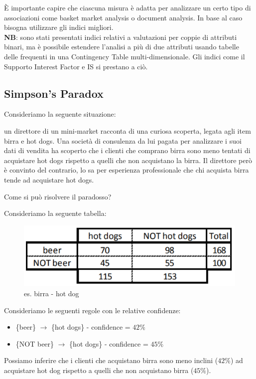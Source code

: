 È importante capire che ciascuna misura è adatta per analizzare un certo tipo di associazioni come basket market analysis o document analysis. In base al caso bisogna utilizzare gli indici migliori.\\

\textbf{NB}: sono stati presentati indici relativi a valutazioni per coppie di attributi binari, ma è possibile estendere l'analisi a più di due attributi usando tabelle delle frequenti in una Contingency Table multi-dimensionale. Gli indici come il Supporto Interest Factor e IS si prestano a ciò.

\subsection{Simpson's Paradox}

Consideriamo la seguente situazione:

un direttore di un mini-market racconta di una curiosa scoperta, legata agli item birra e hot dogs. Una società di consulenza da lui pagata per analizzare i suoi dati di vendita ha scoperto che i clienti che comprano birra sono meno tentati di acquistare hot dogs rispetto a quelli che non acquistano la birra. Il direttore però è convinto del contrario, lo sa per esperienza professionale che chi acquista birra tende ad acquistare hot dogs.

Come si può risolvere il paradosso?

Consideriamo la seguente tabella:
\begin{figure}[H]
	\centering
	\includegraphics[height=0.2 \linewidth]{association/pict/beer_hotdog.png}
	\caption{es. birra - hot dog}
\end{figure}
Consideriamo le seguenti regole con le relative confidenze:
\begin{itemize}
	\item \{beer\} $\rightarrow$ \{hot dogs\} - confidence = $42\%$
	\item \{NOT beer\} $\rightarrow$ \{hot dogs\} - confidence = $45\%$
\end{itemize}	
Possiamo inferire che i clienti che acquistano birra sono meno inclini ($42\%$) ad acquistare hot dog rispetto a quelli che non acquistano birra ($45\%$).

